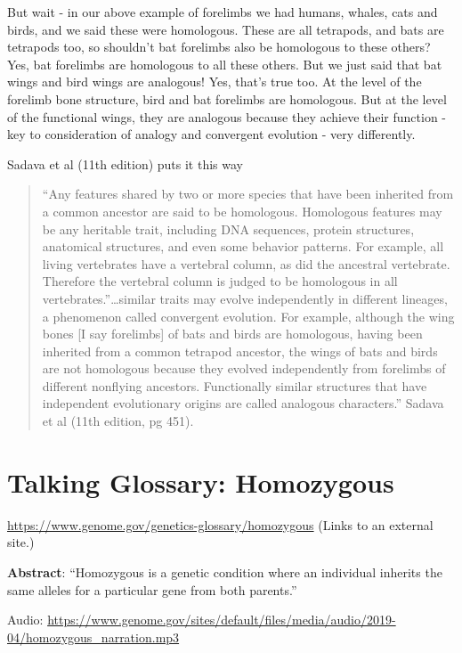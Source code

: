 \documentclass[
]{book}
\begin{document}
But wait - in our above example of forelimbs we had humans, whales, cats and birds, and we said these were homologous. These are all tetrapods, and bats are tetrapods too, so shouldn't bat forelimbs also be homologous to these others? Yes, bat forelimbs are homologous to all these others. But we just said that bat wings and bird wings are analogous! Yes, that's true too. At the level of the forelimb bone structure, bird and bat forelimbs are homologous. But at the level of the functional wings, they are analogous because they achieve their function - key to consideration of analogy and convergent evolution - very differently.

Sadava et al (11th edition) puts it this way

\begin{quote}
``Any features shared by two or more species that have been inherited from a common ancestor are said to be homologous. Homologous features may be any heritable trait, including DNA sequences, protein structures, anatomical structures, and even some behavior patterns. For example, all living vertebrates have a vertebral column, as did the ancestral vertebrate. Therefore the vertebral column is judged to be homologous in all vertebrates.''\ldots similar traits may evolve independently in different lineages, a phenomenon called convergent evolution. For example, although the wing bones {[}I say forelimbs{]} of bats and birds are homologous, having been inherited from a common tetrapod ancestor, the wings of bats and birds are not homologous because they evolved independently from forelimbs of different nonflying ancestors. Functionally similar structures that have independent evolutionary origins are called analogous characters.'' Sadava et al (11th edition, pg 451).
\end{quote}

\hypertarget{talking-glossary-homozygous}{%
\section{Talking Glossary: Homozygous}\label{talking-glossary-homozygous}}

\url{https://www.genome.gov/genetics-glossary/homozygous} (Links to an external site.)

\textbf{Abstract}: ``Homozygous is a genetic condition where an individual inherits the same alleles for a particular gene from both parents.''

Audio: \url{https://www.genome.gov/sites/default/files/media/audio/2019-04/homozygous_narration.mp3}
\end{document}
